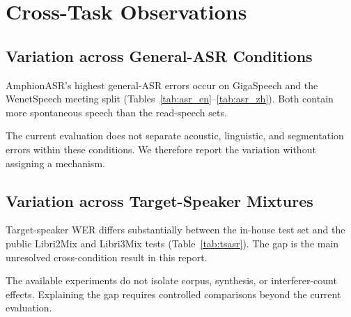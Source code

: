 \section{Cross-Task Observations}
\label{sec:analysis}

\subsection{Variation across General-ASR Conditions}

AmphionASR's highest general-ASR errors occur on GigaSpeech and the
WenetSpeech meeting split (Tables~\ref{tab:asr_en}--\ref{tab:asr_zh}).
Both contain more spontaneous speech than the read-speech sets.

The current evaluation does not separate acoustic, linguistic, and
segmentation errors within these conditions.
We therefore report the variation without assigning a mechanism.

\subsection{Variation across Target-Speaker Mixtures}

Target-speaker WER differs substantially between the in-house test set
and the public Libri2Mix and Libri3Mix tests
(Table~\ref{tab:tsasr}).
The gap is the main unresolved cross-condition result in this report.

The available experiments do not isolate corpus, synthesis, or
interferer-count effects.
Explaining the gap requires controlled comparisons beyond the current
evaluation.
